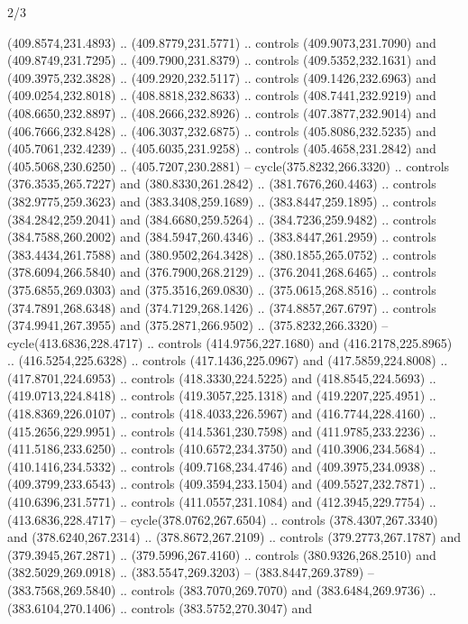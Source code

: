 \begin{flagdescription}{2/3}
\begin{scope}[xshift=0.5\flaglength,yshift=0.5\flagwidth,scale=\flagwidth/495.65]
\begin{scope}[y=0.8pt, x=0.8pt, yscale=-1,shift={(-463.76,-309.78)}]
  (409.8574,231.4893) .. (409.8779,231.5771) .. controls (409.9073,231.7090) and
  (409.8749,231.7295) .. (409.7900,231.8379) .. controls (409.5352,232.1631) and
  (409.3975,232.3828) .. (409.2920,232.5117) .. controls (409.1426,232.6963) and
  (409.0254,232.8018) .. (408.8818,232.8633) .. controls (408.7441,232.9219) and
  (408.6650,232.8897) .. (408.2666,232.8926) .. controls (407.3877,232.9014) and
  (406.7666,232.8428) .. (406.3037,232.6875) .. controls (405.8086,232.5235) and
  (405.7061,232.4239) .. (405.6035,231.9258) .. controls (405.4658,231.2842) and
  (405.5068,230.6250) .. (405.7207,230.2881) -- cycle(375.8232,266.3320) ..
  controls (376.3535,265.7227) and (380.8330,261.2842) .. (381.7676,260.4463) ..
  controls (382.9775,259.3623) and (383.3408,259.1689) .. (383.8447,259.1895) ..
  controls (384.2842,259.2041) and (384.6680,259.5264) .. (384.7236,259.9482) ..
  controls (384.7588,260.2002) and (384.5947,260.4346) .. (383.8447,261.2959) ..
  controls (383.4434,261.7588) and (380.9502,264.3428) .. (380.1855,265.0752) ..
  controls (378.6094,266.5840) and (376.7900,268.2129) .. (376.2041,268.6465) ..
  controls (375.6855,269.0303) and (375.3516,269.0830) .. (375.0615,268.8516) ..
  controls (374.7891,268.6348) and (374.7129,268.1426) .. (374.8857,267.6797) ..
  controls (374.9941,267.3955) and (375.2871,266.9502) .. (375.8232,266.3320) --
  cycle(413.6836,228.4717) .. controls (414.9756,227.1680) and
  (416.2178,225.8965) .. (416.5254,225.6328) .. controls (417.1436,225.0967) and
  (417.5859,224.8008) .. (417.8701,224.6953) .. controls (418.3330,224.5225) and
  (418.8545,224.5693) .. (419.0713,224.8418) .. controls (419.3057,225.1318) and
  (419.2207,225.4951) .. (418.8369,226.0107) .. controls (418.4033,226.5967) and
  (416.7744,228.4160) .. (415.2656,229.9951) .. controls (414.5361,230.7598) and
  (411.9785,233.2236) .. (411.5186,233.6250) .. controls (410.6572,234.3750) and
  (410.3906,234.5684) .. (410.1416,234.5332) .. controls (409.7168,234.4746) and
  (409.3975,234.0938) .. (409.3799,233.6543) .. controls (409.3594,233.1504) and
  (409.5527,232.7871) .. (410.6396,231.5771) .. controls (411.0557,231.1084) and
  (412.3945,229.7754) .. (413.6836,228.4717) -- cycle(378.0762,267.6504) ..
  controls (378.4307,267.3340) and (378.6240,267.2314) .. (378.8672,267.2109) ..
  controls (379.2773,267.1787) and (379.3945,267.2871) .. (379.5996,267.4160) ..
  controls (380.9326,268.2510) and (382.5029,269.0918) .. (383.5547,269.3203) --
  (383.8447,269.3789) -- (383.7568,269.5840) .. controls (383.7070,269.7070) and
  (383.6484,269.9736) .. (383.6104,270.1406) .. controls (383.5752,270.3047) and

\end{scope}
\end{scope}
\end{flagdescription}
